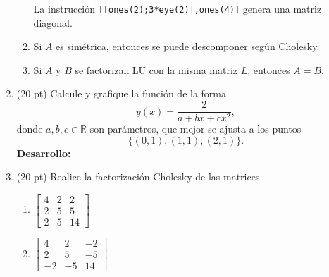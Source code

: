 \documentclass[11pt]{article}
\begin{document}
\begin{enumerate}
\begin{enumerate}
    \begin{minipage}{0.4\textwidth}
	La instrucci\'on 
    \texttt{[[ones(2);3*eye(2)],ones(4)]}
    genera una matriz diagonal.
    \end{minipage} 
    \begin{minipage}{0.4\textwidth}
    \end{minipage}
\item
\fbox{ \begin{minipage}{1cm}  \hfill\vspace{1cm}   		
    \end{minipage} } 
    \begin{minipage}{0.4\textwidth}
	Si $A$ es sim\'etrica, entonces se puede descomponer seg\'un Cholesky.
    \end{minipage} 
    \begin{minipage}{0.4\textwidth}
    \end{minipage}
%
\item
\fbox{ \begin{minipage}{1cm}   \hfill\vspace{1cm}   		
    \end{minipage} } 
    \begin{minipage}{0.4\textwidth}
	Si $A$ y $B$ se factorizan LU con la misma matriz $L$, entonces $A=B$.
	\end{minipage} 
    \begin{minipage}{0.4\textwidth}
    \end{minipage}
\end{enumerate}

\newpage 
\item  (20 pt)
Calcule y grafique la funci\'on de la forma
$$
y(x)=\frac{2}{a+bx+cx^2},
$$
donde $a,b,c\in\mathbb{R}$ son par\'ametros, que mejor se ajusta a los puntos
$$
\{(0,1),(1,1),(2,1)\}.
$$
\textbf{Desarrollo:} 

\newpage
\item  (20 pt) Realice la factorizaci\'on Cholesky de las matrices
\begin{multicols}{2}
\begin{enumerate}
	\item  $\begin{bmatrix}
    		4 & 2 & 2 \\
            2 & 5 & 5 \\
            2 & 5 & 14
    		\end{bmatrix}$
   	\item  $\begin{bmatrix}
    		4  & 2   & -2 \\
            2  & 5   & -5 \\
            -2 & -5  & 14
    		\end{bmatrix}$
\end{enumerate}
\end{multicols}


\end{enumerate}
\end{document}
